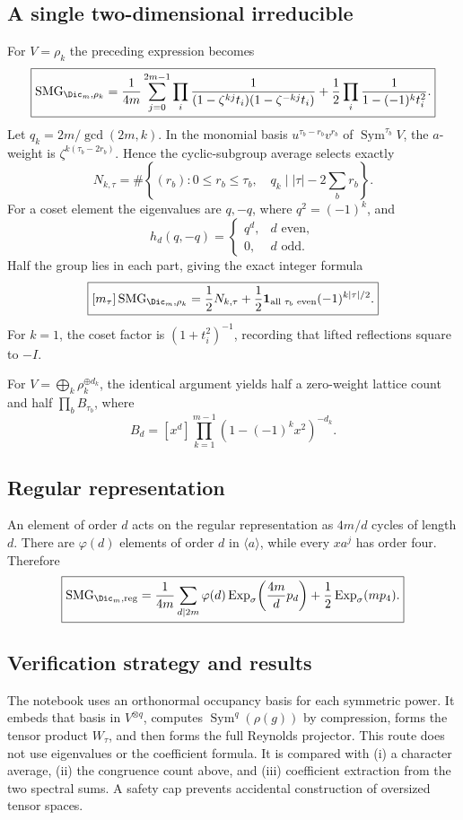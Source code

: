 \documentclass[10pt]{article}
\newcommand{\Sym}{\operatorname{Sym}}
\newcommand{\SMG}{\operatorname{SMG}}
\begin{document}
\subsection{A single two-dimensional irreducible}
For $V=\rho_k$ the preceding expression becomes
\[
 \boxed{\SMG_{\Dic_m,\rho_k}=
 \frac1{4m}\sum_{j=0}^{2m-1}\prod_i
 \frac1{(1-\zeta^{kj}t_i)(1-\zeta^{-kj}t_i)}
 +\frac12\prod_i\frac1{1-(-1)^kt_i^2}.}
\]
Let $q_k=2m/\gcd(2m,k)$.  In the monomial basis
$u^{\tau_b-r_b}v^{r_b}$ of $\Sym^{\tau_b}V$, the $a$-weight is
$\zeta^{k(\tau_b-2r_b)}$.  Hence the cyclic-subgroup average selects exactly
\[
 N_{k,\tau}=\#\left\{(r_b):0\le r_b\le\tau_b,\quad
 q_k\mid |\tau|-2\sum_b r_b\right\}.
\]
For a coset element the eigenvalues are $q,-q$, where $q^2=(-1)^k$, and
\[
 h_d(q,-q)=\begin{cases}q^d,&d\text{ even},\\0,&d\text{ odd}.
 \end{cases}
\]
Half the group lies in each part, giving the exact integer formula
\[
 \boxed{[m_\tau]\SMG_{\Dic_m,\rho_k}
 =\frac12N_{k,\tau}+\frac12\mathbf1_{\text{all }\tau_b\text{ even}}
 (-1)^{k|\tau|/2}.}
\]
For $k=1$, the coset factor is $(1+t_i^2)^{-1}$, recording that lifted
reflections square to $-I$.

For $V=\bigoplus_k\rho_k^{\oplus d_k}$, the identical argument yields half a
zero-weight lattice count and half $\prod_bB_{\tau_b}$, where
\[
 B_d=[x^d]\prod_{k=1}^{m-1}(1-(-1)^kx^2)^{-d_k}.
\]

\subsection{Regular representation}
An element of order $d$ acts on the regular representation as $4m/d$ cycles
of length $d$.  There are $\varphi(d)$ elements of order $d$ in
$\langle a\rangle$, while every $xa^j$ has order four.  Therefore
\[
 \boxed{\SMG_{\Dic_m,\mathrm{reg}}=
 \frac1{4m}\sum_{d\mid2m}\varphi(d)
 \operatorname{Exp}_\sigma\!\left(\frac{4m}{d}p_d\right)
 +\frac12\operatorname{Exp}_\sigma(mp_4).}
\]

\subsection{Verification strategy and results}
The notebook uses an orthonormal occupancy basis for each symmetric power.
It embeds that basis in $V^{\otimes q}$, computes
$\Sym^q(\rho(g))$ by compression, forms the tensor product $W_\tau$, and then
forms the full Reynolds projector.  This route does not use eigenvalues or the
coefficient formula.  It is compared with (i) a character average, (ii) the
congruence count above, and (iii) coefficient extraction from the two spectral
sums.  A safety cap prevents accidental construction of oversized tensor
spaces.
\end{document}
